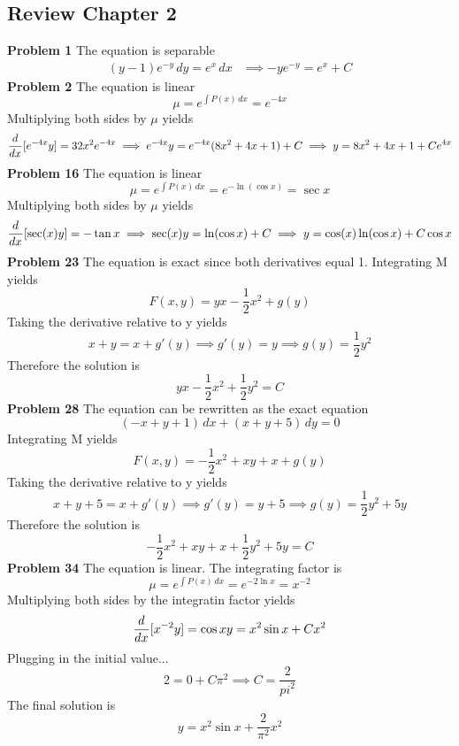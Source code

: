 \subsection*{Review Chapter 2}
\textbf{Problem 1}
The equation is separable 
\begin{align*}
    (y-1)e^{-y} \,dy = e^x \,dx
    &\implies -ye^{-y} = e^x + C
\end{align*}
\textbf{Problem 2}
The equation is linear
\[
    \mu = e^{\int P(x) \,dx} = e^{-4x}
\]
Multiplying both sides by $\mu$ yields 
\[
    \frac{d^{} }{d x^{}}[e^{-4x}y] = 32x^2e^{-4x}
    \implies e^{-4x}y = e^{-4x} (8x^2+4x+1) + C
    \implies y = 8x^2+4x+1 + Ce^{4x}
\]
\textbf{Problem 16}
The equation is linear 
\[
    \mu = e^{\int P(x) \,dx} = e^{-\ln(\cos x)} = \sec x
\]
Multiplying both sides by $\mu$ yields 
\[
    \frac{d^{} }{d x^{}}[\sec(x)y] = -\tan x
    \implies \sec(x)y = \ln(\cos x) + C
    \implies y = \cos(x)\ln(\cos x) + C\cos x
\]
\textbf{Problem 23}
The equation is exact since both derivatives equal 1.
Integrating M yields 
\[
    F(x,y) = yx - \frac{1}{2}x^2 + g(y)
\]
Taking the derivative relative to y yields 
\[
    x+y = x + g'(y) \implies g'(y) = y \implies g(y) = \frac{1}{2}y^2
\]
Therefore the solution is 
\[
    yx - \frac{1}{2}x^2 + \frac{1}{2}y^2 = C
\]
\textbf{Problem 28}
The equation can be rewritten as the exact equation
\[
    (-x+y+1)\,dx+ (x+y+5)\,dy = 0
\]
Integrating M yields 
\[
    F(x,y) =-\frac{1}{2}x^2 + xy + x + g(y)
\]
Taking the derivative relative to y yields 
\[
    x+y+5 = x + g'(y) 
    \implies g'(y) = y+5 
    \implies g(y) = \frac{1}{2}y^2 + 5y
\]
Therefore the solution is 
\[
    -\frac{1}{2}x^2 + xy + x + \frac{1}{2}y^2 + 5y = C
\]
\textbf{Problem 34}
The equation is linear.
The integrating factor is
\[
    \mu = e^{\int P(x) \,dx} = e^{-2\ln x} = x^{-2}
\]
Multiplying both sides by the integratin factor yields 
\[
    \frac{d^{} }{d x^{}} [x^{-2}y] = \cos x
    y = x^2\sin x + Cx^2
\]
Plugging in the initial value... 
\[
    2 = 0 + C\pi^2 
    \implies C = \frac{2}{pi^2}
\]
The final solution is 
\[
    y = x^2\sin x + \frac{2}{\pi^2}x^2
\]